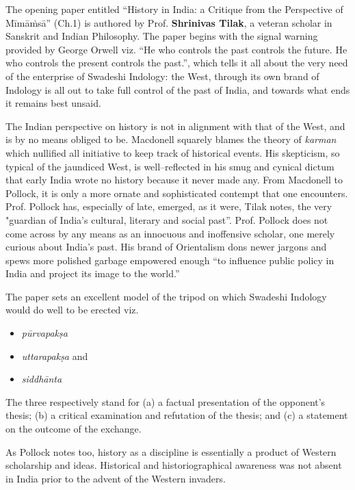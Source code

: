 The opening paper entitled “History in India: a Critique from the Perspective of Mīmāṁsā” (Ch.1) is authored by Prof. \textbf{Shrinivas Tilak}, a veteran scholar in Sanskrit and Indian Philosophy. The paper begins with the signal warning provided by George Orwell viz. “He who controls the past controls the future. He who controls the present controls the past.”, which tells it all about the very need of the enterprise of Swadeshi Indology: the West, through its own brand of Indology is all out to take full control of the past of India, and towards what ends it remains best unsaid. 

The Indian perspective on history is not in alignment with that of the West, and is by no means obliged to be. Macdonell squarely blames the theory of \textit{karman} which nullified all initiative to keep track of historical events. His skepticism, so typical of the jaundiced West, is well–reflected in his smug and cynical dictum that early India wrote no history because it never made any. From Macdonell to Pollock, it is only a more ornate and sophisticated contempt that one encounters. Prof. Pollock has, especially of late, emerged, as it were, Tilak notes, the very "guardian of India’s cultural, literary and social past”. Prof. Pollock does not come across by any means as an innocuous and inoffensive scholar, one merely curious about India’s past. His brand of Orientalism dons newer jargons and spews more polished garbage empowered enough “to influence public policy in India and project its image to the world.”

The paper sets an excellent model of the tripod on which Swadeshi Indology would do well to be erected viz.

\begin{itemize}
\item \textit{pūrvapakṣa}

 \item \textit{uttarapakṣa} and 

 \item \textit{siddhānta}

\end{itemize}

The three respectively stand for (a) a factual presentation of the opponent’s thesis; (b) a critical examination and refutation of the thesis; and (c) a statement on the outcome of the exchange. 

As Pollock notes too, history as a discipline is essentially a product of Western scholarship and ideas. Historical and historiographical awareness was not absent in India prior to the advent of the Western invaders. 

